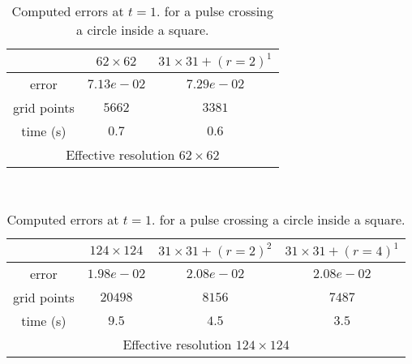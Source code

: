 \begin{table}[hbt]
\footnotesize
\begin{center}
\begin{tabular}{|c|c|c|}  \hline 
            & $62\times 62$  & $31\times31+ (r=2)^1$  \\   \hline 
 error      & $7.13e-02$     & $7.29e-02$  \\  
grid points & $5662$   &   $3381$     \\ 
time (s)    & $0.7$   &  $0.6$      \\ 
 \hline 
 \multicolumn{3}{c}{Effective resolution $62\times62$} \\ 
 \end{tabular}  \\ 
\vspace{.25\baselineskip}
\begin{tabular}{|c|c|c|c|}                   \hline 
       &  $124\times 124$ & $31\times31+ (r=2)^2$ & $31\times31+ (r=4)^1$  \\   \hline 
 error       & $1.98e-02$      & $2.08e-02$  & $2.08e-02$  \\  
 grid points &  $20498$  &  $8156$      &  $ 7487$      \\ 
 time (s)    &    $9.5$        &   $4.5$           &  $3.5$   \\ 
  \hline 
 \multicolumn{4}{c}{Effective resolution $124\times124$}  \\   
 \end{tabular}  
 \end{center}  
 \caption{Computed errors at $t=1.$ for a pulse crossing a circle inside a square.}  
 \label{tab:amrh.ciceGT}  
 \end{table}  
